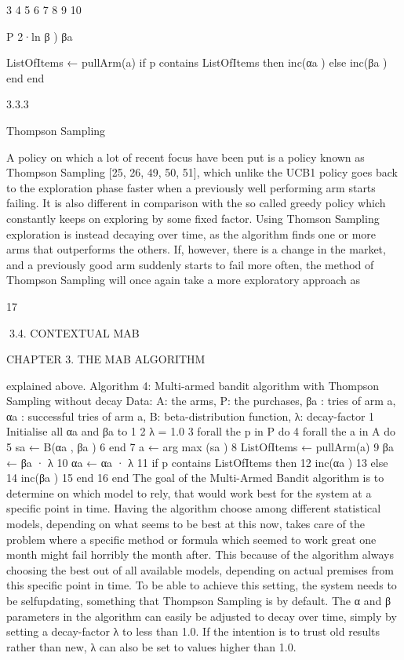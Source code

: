 3
4
5
6
7
8
9
10

P
2·ln β
)
βa

ListOfItems ← pullArm(a)
if p contains ListOfItems then
inc(αa )
else
inc(βa )
end
end

3.3.3

Thompson Sampling

A policy on which a lot of recent focus have been put is a policy known as Thompson
Sampling [25, 26, 49, 50, 51], which unlike the UCB1 policy goes back to the exploration
phase faster when a previously well performing arm starts failing. It is also different in
comparison with the so called greedy policy which constantly keeps on exploring by
some fixed factor. Using Thomson Sampling exploration is instead decaying over time,
as the algorithm finds one or more arms that outperforms the others. If, however, there
is a change in the market, and a previously good arm suddenly starts to fail more often,
the method of Thompson Sampling will once again take a more exploratory approach as

17

3.4. CONTEXTUAL MAB

CHAPTER 3. THE MAB ALGORITHM

explained above.
Algorithm 4: Multi-armed bandit algorithm with Thompson Sampling without
decay
Data: A: the arms, P: the purchases, βa : tries of arm a, αa : successful tries of
arm a, B: beta-distribution function, λ: decay-factor
1 Initialise all αa and βa to 1
2 λ = 1.0
3 forall the p in P do
4
forall the a in A do
5
sa ← B(αa , βa )
6
end
7
a ← arg max (sa )
8
ListOfItems ← pullArm(a)
9
βa ← βa · λ
10
αa ← αa · λ
11
if p contains ListOfItems then
12
inc(αa )
13
else
14
inc(βa )
15
end
16 end
The goal of the Multi-Armed Bandit algorithm is to determine on which model to rely,
that would work best for the system at a specific point in time. Having the algorithm
choose among different statistical models, depending on what seems to be best at this
now, takes care of the problem where a specific method or formula which seemed to
work great one month might fail horribly the month after. This because of the algorithm
always choosing the best out of all available models, depending on actual premises from
this specific point in time. To be able to achieve this setting, the system needs to be selfupdating, something that Thompson Sampling is by default. The α and β parameters in
the algorithm can easily be adjusted to decay over time, simply by setting a decay-factor
λ to less than 1.0. If the intention is to trust old results rather than new, λ can also be
set to values higher than 1.0.

